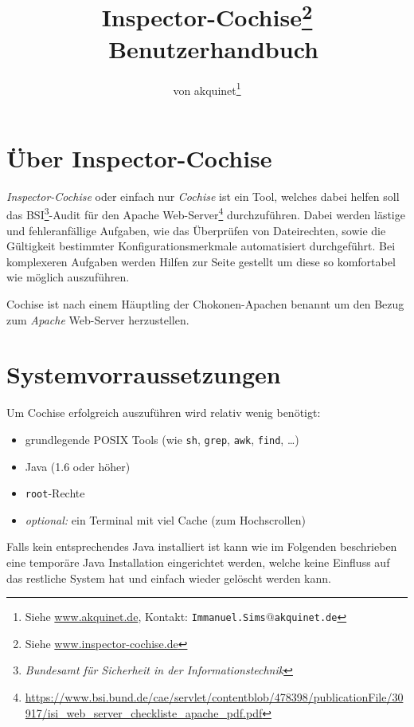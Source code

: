 \documentclass{article}
\title{Inspector-Cochise\footnote{Siehe \url{www.inspector-cochise.de}} \ Benutzerhandbuch}
\author{von akquinet\footnote{Siehe \url{www.akquinet.de}, Kontakt: \texttt{Immanuel.Sims$\texttt{@}$akquinet.de}}}
\begin{document}
\maketitle


\section{Über Inspector-Cochise}
\emph{Inspector-Cochise} oder einfach nur \emph{Cochise} ist ein Tool, welches dabei helfen soll das BSI\footnote{\emph{Bundesamt für
Sicherheit in der Informationstechnik}}-Audit für den Apache Web-Server\footnote{
\url{https://www.bsi.bund.de/cae/servlet/contentblob/478398/publicationFile/30917/isi_web_server_checkliste_apache_pdf.pdf}}
durchzuführen. Dabei werden lästige und fehleranfällige Aufgaben, wie das Überprüfen von Dateirechten, sowie die Gültigkeit bestimmter
Konfigurationsmerkmale automatisiert durchgeführt. Bei komplexeren Aufgaben werden Hilfen zur Seite gestellt um diese so komfortabel
wie möglich auszuführen.
\par
Cochise ist nach einem Häuptling der Chokonen-Apachen benannt um den Bezug zum \emph{Apache} Web-Server herzustellen. 

\section{Systemvorraussetzungen}
Um Cochise erfolgreich auszuführen wird relativ wenig benötigt:
\begin{itemize}
  \item grundlegende POSIX Tools (wie \texttt{sh}, \texttt{grep}, \texttt{awk}, \texttt{find}, \ldots)
  \item Java (1.6 oder höher)
  \item \texttt{root}-Rechte
  \item \emph{optional:} ein Terminal mit viel Cache (zum Hochscrollen) 
\end{itemize}
Falls kein entsprechendes Java installiert ist kann wie im Folgenden beschrieben eine temporäre Java Installation eingerichtet werden, welche
keine Einfluss auf das restliche System hat und einfach wieder gelöscht werden kann.
\end{document}
